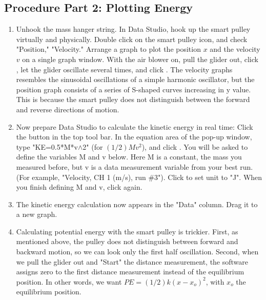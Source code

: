 \documentclass{article}
\begin{document}
\subsection*{Procedure Part 2: Plotting Energy}
\begin{enumerate}
\item Unhook the mass hanger string. In Data Studio, hook up the smart pulley virtually and physically. Double click on the smart pulley icon, and check "Position," "Velocity." Arrange a graph to plot the position $x$ and the velocity $v$ on a single graph window. With the air blower on, pull the glider out, click , let the glider oscillate several times, and click . The velocity graphs resembles the sinusoidal oscillations of a simple harmonic oscillator, but the position graph consists of a series of S-shaped curves increasing in y value. This is because the smart pulley does not distinguish between the forward and reverse directions of motion. 

\item Now prepare Data Studio to calculate the kinetic energy in real time: Click the  button in the top tool bar. In the equation area of the pop-up window, type "KE=0.5*M*v$\wedge$2" (for $(1/2)Mv^2$), and click . You will be asked to define the variables M and v below. Here M is a constant, the mass you measured before, but v is a data measurement variable from your best run. (For example, "Velocity, CH 1 (m/s), run $\#$3"). Click  to set unit to "J". When you finish defining M and v, click  again.

\item The kinetic energy calculation now appears in the "Data" column. Drag it to a new graph.

\item Calculating potential energy with the smart pulley is trickier. First, as mentioned above, the pulley does not distinguish between forward and backward motion, so we can look only the first half oscillation. Second, when we pull the glider out and "Start" the distance measurement, the software assigns zero to the first distance measurement instead of the equilibrium position. In other words, we want $PE=(1/2)k(x-x_o)^2$, with $x_o$ the equilibrium position.



\end{enumerate}
\end{document}
